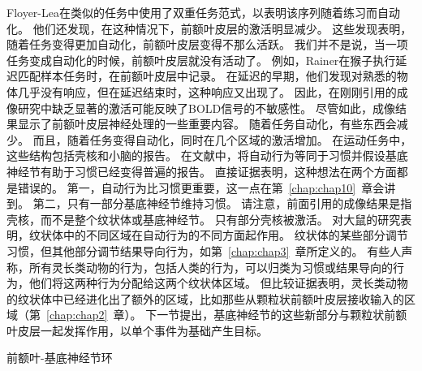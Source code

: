 Floyer-Lea\cite{floyer2004changing}在类似的任务中使用了双重任务范式，以表明该序列随着练习而自动化。
他们还发现，在这种情况下，前额叶皮层的激活明显减少。
这些发现表明，随着任务变得更加自动化，前额叶皮层变得不那么活跃。
我们并不是说，当一项任务变成自动化的时候，前额叶皮层就没有活动了。
例如，Rainer\cite{rainer2002timecourse}在猴子执行延迟匹配样本任务时，在前额叶皮层中记录。
在延迟的早期，他们发现对熟悉的物体几乎没有响应，但在延迟结束时，这种响应又出现了。
因此，在刚刚引用的成像研究中缺乏显著的激活可能反映了BOLD信号的不敏感性。
尽管如此，成像结果显示了前额叶皮层神经处理的一些重要内容。
随着任务自动化，有些东西会减少。
而且，随着任务变得自动化，同时在几个区域的激活增加。
在运动任务中，这些结构包括壳核和小脑\cite{floyer2004changing,toni1998time}的报告。
在文献中，将自动行为等同于习惯并假设基底神经节有助于习惯已经变得普遍\cite{fernandez2001visual,broadbent2007rats}的报告。
直接证据表明，这种想法在两个方面都是错误的。
第一，自动行为比习惯更重要，这一点在第~\ref{chap:chap10}~章会讲到。
第二，只有一部分基底神经节维持习惯。
请注意，前面引用的成像结果是指壳核，而不是整个纹状体或基底神经节。
只有部分壳核被激活。
对大鼠的研究表明，纹状体中的不同区域在自动行为的不同方面起作用\cite{yin2008reward}。
纹状体的某些部分调节习惯，但其他部分调节结果导向行为，如第~\ref{chap:chap3}~章所定义的。
有些人声称，所有灵长类动物的行为，包括人类的行为，可以归类为习惯或结果导向的行为，他们将这两种行为分配给这两个纹状体区域\cite{balleine2010human}。
但比较证据表明，灵长类动物的纹状体中已经进化出了额外的区域，比如那些从颗粒状前额叶皮层接收输入的区域（第~\ref{chap:chap2}~章）。
下一节提出，基底神经节的这些新部分与颗粒状前额叶皮层一起发挥作用，以单个事件为基础产生目标。



前额叶-基底神经节环

